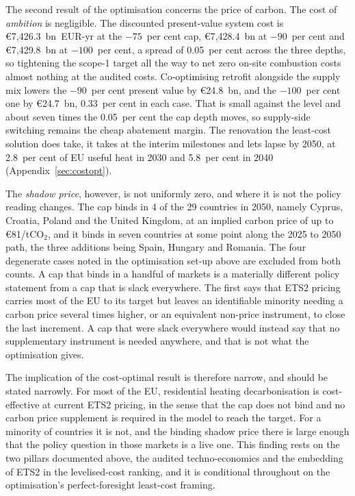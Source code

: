 The second result of the optimisation concerns the price of carbon. The cost of \emph{ambition} is
negligible. The discounted present-value system cost is
\euro{}7{,}426.3~bn~EUR-yr at the $-75$~per cent cap, \euro{}7{,}428.4~bn at
$-90$~per cent and \euro{}7{,}429.8~bn at $-100$~per cent, a spread of
0.05~per cent across the three depths, so tightening the scope-1 target all the way
to net zero on-site combustion costs almost nothing at the audited costs.
Co-optimising retrofit alongside the supply mix lowers the $-90$~per cent present value by \euro{}24.8~bn, and the $-100$~per cent one by \euro{}24.7~bn, 0.33~per cent in each case. That is small against the level and about seven times the 0.05~per cent the cap depth moves, so supply-side switching remains the cheap abatement margin. The renovation the least-cost solution does take, it takes at the interim milestones and lets lapse by 2050, at 2.8~per cent of EU useful heat in 2030 and 5.8~per cent in 2040 (Appendix~\ref{sec:costopt}).

The \emph{shadow price}, however, is not uniformly zero, and where it is not the policy
reading changes. The cap binds in 4 of the 29 countries in 2050, namely
Cyprus, Croatia, Poland and the United Kingdom, at an implied carbon price of up to
\euro{}81/tCO$_2$, and it binds in seven countries at some point along the 2025 to
2050 path, the three additions being Spain, Hungary and Romania. The four
degenerate cases noted in the optimisation set-up above are excluded from both
counts. A
cap that binds in a handful of markets is a materially different policy statement
from a cap that is slack everywhere. The first says that ETS2 pricing carries most
of the EU to its target but leaves an identifiable minority needing a carbon price
several times higher, or an equivalent non-price instrument, to close the last
increment. A cap that were slack everywhere would instead say that no supplementary
instrument is needed anywhere, and that is not what the optimisation gives.

The implication of the cost-optimal result is therefore narrow, and should be stated
narrowly. For most of the EU, residential heating decarbonisation
is cost-effective at current ETS2 pricing, in the sense that the cap does not bind
and no carbon price supplement is required in the model to reach the target. For a
minority of countries it is not, and the binding shadow price there is large enough
that the policy question in those markets is a live one. This finding rests on the
two pillars documented above, the audited techno-economics and the embedding of
ETS2 in the levelised-cost ranking, and it is conditional throughout on the
optimisation's perfect-foresight least-cost framing.

